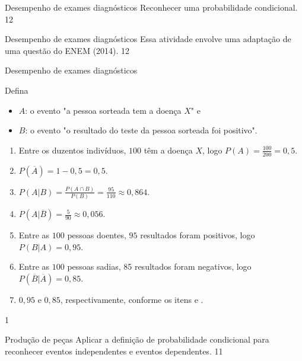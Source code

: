 \clearpage
\def\currentcolor{session2}
\begin{objectives}{Desempenho de exames diagnósticos}
{
Reconhecer uma probabilidade condicional.
}{1}{2}
\end{objectives}
\begin{sugestions}{Desempenho de exames diagnósticos}
{
Essa atividade envolve uma adaptação de uma questão do ENEM (2014).
}{1}{2}
\end{sugestions}
\clearmargin
\begin{answer}{Desempenho de exames diagnósticos}
{
Defina 
\begin{itemize}
\item $A$: o evento "a pessoa sorteada tem a doença $X$"{} e 
\item $B$: o evento "o resultado do teste da pessoa sorteada foi positivo".
\end{itemize}

\begin{enumerate}
\item Entre os duzentos indivíduos, $100$ têm a doença $X$, logo $P(A)=\frac{100}{200}=0{,}5$.
\item $P(\overline{A})=1-0,5=0,5$.
\item $P(A|B)=\frac{P(A\cap B)}{P(B)}=\frac{95}{110}\approx0{,}864$.
\item $P(A|\overline{B})=\frac{5}{90}\approx0,056$.
\item Entre as $100$ pessoas doentes, $95$ resultados foram positivos, logo $P(B|A)=0{,}95$.
\item Entre as $100$ pessoas sadias, 85 resultados foram negativos, logo $P(\overline{B}|\overline{A})=0,85$.
\item $0{,}95$ e $0{,}85$, respectivamente, conforme os itens  e .
\end{enumerate}
}{1}
\end{answer}
\begin{objectives}{Produção de peças}
{
Aplicar a definição de probabilidade condicional para reconhecer eventos independentes e eventos dependentes.
}{1}{1}
\end{objectives}
